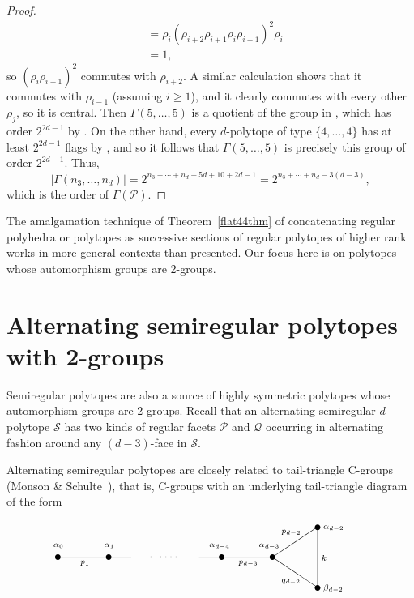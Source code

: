 \documentclass[12pt]{amsart}
\newcommand{\calP}{\ensuremath{\mathcal{P}}}
\newcommand{\G}{\Gamma}
\theoremstyle{definition}
\begin{document}
\begin{proof}
\begin{align*}
	&= \rho_i (\rho_{i+2} \rho_{i+1} \rho_i \rho_{i+1})^2 \rho_i \\
	&= 1,
	\end{align*}
	so $(\rho_i \rho_{i+1})^2$ commutes with $\rho_{i+2}$. A similar calculation shows that it commutes with $\rho_{i-1}$ (assuming $i \geq 1$), and it clearly commutes with every other $\rho_j$, so it is central. Then $\G(5, \ldots, 5)$ is a quotient of the group in \cite[Definition 5.1]{Con2013}, which has order $2^{2d-1}$ by \cite[Theorem 5.2]{Con2013}. On the other hand, every $d$-polytope of type $\{4, \ldots, 4\}$ has at least $2^{2d-1}$ flags by \cite[Theorem 3.2]{Con2013}, and so it follows that $\G(5, \ldots, 5)$ is precisely this group of order $2^{2d-1}$. Thus,
	\[ |\G(n_3, \ldots, n_d)| = 2^{n_3 + \cdots + n_d - 5d + 10 + 2d - 1} = 2^{n_3 + \cdots + n_d - 3(d-3)}, \]
	which is the order of $\G(\calP)$.
	\end{proof}
	


The amalgamation technique of Theorem~\ref{flat44thm} of concatenating regular polyhedra or polytopes as successive sections of regular polytopes of higher rank works in more general contexts than presented. Our focus here is on polytopes whose automorphism groups are 2-groups.

\section{Alternating semiregular polytopes with 2-groups}
\label{semiregpols2}

Semiregular polytopes are also a source of highly symmetric polytopes whose automorphism groups are 2-groups. Recall that an alternating semiregular $d$-polytope $\mathcal S$ has two kinds of regular facets $\mathcal P$ and $\mathcal Q$ occurring in alternating fashion around any $(d-3)$-face in $\mathcal S$. 

Alternating semiregular polytopes are closely related to tail-triangle C-groups (Monson \& Schulte~\cite{MonSch2012,MonSch2020}), that is, C-groups with an underlying tail-triangle diagram of the form 
\medskip
\begin{equation}
\label{tailtrianglegroup}
\begin{picture}(210,38)
\put(100,2){
\multiput(15,0)(45,0){2}{\circle*{5}}
\multiput(100,-27)(0,53.3){2}{\circle*{5}}
\multiput(-130,0)(45,0){2}{\circle*{5}}
\put(-5,0){\line(1,0){20}}
\put(-85,0){\line(1,0){20}}
\put(-130,0){\line(1,0){45}}
\put(15,0){\line(1,0){45}}
\put(60,0){\line(3,2){40}}
\put(60,0){\line(3,-2){40}}
\put(100,-27){\line(0,1){53.3}}
\put(4,9){\scriptsize $\alpha_{d-4}$}
\put(48,9){\scriptsize $\alpha_{d-3}$}
\put(30,-6){\scriptsize $p_{d-3}$}
\put(-134,9){\scriptsize $\alpha_{0}$}
\put(-89,9){\scriptsize $\alpha_{1}$}
\put(-110,-6){\scriptsize $p_1$}
\put(-49,-0.5){$\ldots\ldots$}
\put(68,21){\scriptsize $p_{d-2}$}
\put(68,-22){\scriptsize $q_{d-2}$}
\put(105,-29){\scriptsize $\beta_{d-2}$}
\put(105,25){\scriptsize $\alpha_{d-2}$}
\put(103.5,-3){\scriptsize $k$}}
\end{picture}
\end{equation}\medskip\bigskip
\end{document}
